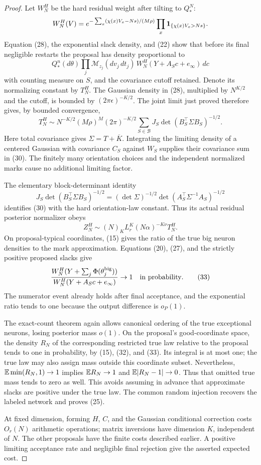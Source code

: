 \begin{proof}
Let $W_N^H$ be the hard residual weight after tilting to $Q_*^N$:
\[
 W_N^H(V)=e^{-\sum_x(\chi(x)V_x-Ns)/(M\rho)}
                         \prod_x\boldsymbol1_{\{\chi(x)V_x>Ns\}}.
\]
Equation (28), the exponential slack density, and (22) show that before
its final negligible restarts the proposal has density proportional to
\[
 Q_*^n(d\theta)\prod_j\mathcal M_{z_j}(dv_j\,dt_j)\,
       W_N^H(Y+A_Sc+e_\infty)\,dc                       \tag{29}
\]
with counting measure on $S$, and the covariance cutoff retained.
Denote its normalizing constant by $T_N^H$.
The Gaussian density in (28), multiplied by $N^{K/2}$ and the cutoff,
is bounded by $(2\pi\epsilon)^{-K/2}$. The joint limit just proved
therefore gives, by bounded convergence,
\[
 T_N^H\sim N^{-K/2}(M\rho)^M(2\pi)^{-K/2}
            \sum_{S\in\mathcal B}J_S
                          \det(B_S^\top\Sigma B_S)^{-1/2}.
 \tag{30}
\]
Here total covariance gives $\Sigma=T+\overline K$. Integrating the
limiting density of a centered Gaussian with covariance $C_S$ against
$W_S$ supplies their covariance sum in (30). The finitely many
orientation choices and the independent normalized marks cause no
additional limiting factor.

The elementary block-determinant identity
\[
 J_S\det(B_S^\top\Sigma B_S)^{-1/2}
   =(\det\Sigma)^{-1/2}
                   \det(A_S^\top\Sigma^{-1}A_S)^{-1/2}
 \tag{31}
\]
identifies (30) with the hard orientation-law constant. Thus its actual
residual posterior normalizer obeys
\[
 Z_N^H\sim (N)_K L_r^K(N\alpha)^{-K\nu}T_N^H.          \tag{32}
\]
On proposal-typical coordinates, (15) gives the ratio of the true big
neuron densities to the mark approximation. Equations (20), (27), and
the strictly positive proposed slacks give
\[
 \frac{W_N^H(Y+\sum_j\Phi(\theta_j^{\rm big}))}
      {W_N^H(Y+A_Sc+e_\infty)}\to1
 \quad\text{in probability}.                           \tag{33}
\]
The numerator event already holds after final acceptance, and the
exponential ratio tends to one because the output difference is
$o_P(1)$.

The exact-count theorem again allows canonical ordering of the true
exceptional neurons, losing posterior mass $o(1)$. On the proposal's
good-coordinate space, the density $R_N$ of the corresponding restricted
true law relative to the proposal tends to one in probability, by
(15), (32), and (33). Its integral is at most one; the true law may
also assign mass outside this coordinate subset. Nevertheless,
$\mathbb E\min(R_N,1)\to1$ implies $\mathbb E R_N\to1$ and
$\mathbb E|R_N-1|\to0$. Thus that omitted true mass tends to zero as well.
This avoids assuming in advance that approximate slacks are positive
under the true law. The common random injection recovers the labeled
network and proves (25).

At fixed dimension, forming $H$, $C$, and the Gaussian conditional
correction costs $O_r(N)$ arithmetic operations; matrix inversions
have dimension $K$, independent of $N$. The other proposals have the
finite costs described earlier. A positive limiting acceptance rate
and negligible final rejection give the asserted expected cost.
\end{proof}

